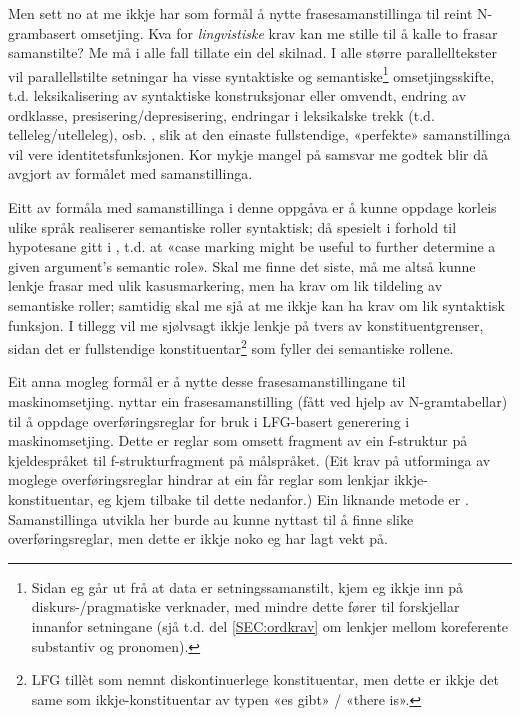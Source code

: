 \documentclass[12pt,a4paper,oneside,draft]{report}
\begin{document}
Men sett no at me ikkje har som formål å nytte frasesamanstillinga til
 reint N-grambasert omsetjing. Kva for \emph{lingvistiske} krav kan me
 stille til å kalle to frasar samanstilte? Me må i alle fall tillate
 ein del skilnad.  I alle større parallelltekster vil parallellstilte
 setningar ha visse syntaktiske og semantiske\footnote{Sidan eg går ut frå at data er setningssamanstilt, kjem eg
       ikkje inn på diskurs-/pragmatiske verknader, med mindre dette
       fører til forskjellar innanfor setningane (sjå t.d. del
       \ref{SEC:ordkrav} om lenkjer mellom koreferente substantiv og
       pronomen). } omsetjingsskifte,
 t.d. leksikalisering av syntaktiske konstruksjonar eller omvendt,
 endring av ordklasse, presisering/depresisering, endringar i
 leksikalske trekk (t.d. telleleg/utelleleg),
 osb. \citep[s.~56--62]{munday2001its}, slik at den einaste
 fullstendige, «perfekte» samanstillinga vil vere
 identitetsfunksjonen. Kor mykje mangel på samsvar me godtek blir då
 avgjort av formålet med samanstillinga.

Eitt av formåla med samanstillinga i denne oppgåva er å kunne oppdage
 korleis ulike språk realiserer semantiske roller syntaktisk; då
 spesielt i forhold til hypotesane gitt i \citet[s.~7]{xpar2008rcn},
 t.d. at «case marking might be useful to further determine a given
 argument's semantic role». Skal me finne det siste, må me altså kunne
 lenkje frasar med ulik kasusmarkering, men ha krav om lik tildeling
 av semantiske roller; samtidig skal me sjå at me ikkje kan ha krav om
 lik syntaktisk funksjon. I tillegg vil me sjølvsagt ikkje lenkje på
 tvers av konstituentgrenser, sidan det er fullstendige
 konstituentar\footnote{LFG tillèt som nemnt diskontinuerlege konstituentar, men dette
        er ikkje det same som ikkje-konstituentar av typen «es gibt» /
        «there is». } som fyller dei semantiske rollene.

Eit anna mogleg formål er å nytte desse frasesamanstillingane til
 maskinomsetjing. \citet{riezler2006gmt} nyttar ein frasesamanstilling
 (fått ved hjelp av N-gramtabellar) til å oppdage overføringsreglar
 for bruk i LFG-basert generering i maskinomsetjing. Dette er reglar
 som omsett fragment av ein f-struktur på kjeldespråket til
 f-strukturfragment på målspråket. (Eit krav på utforminga av moglege
 overføringsreglar hindrar at ein får reglar som lenkjar
 ikkje-konstituentar, eg kjem tilbake til dette nedanfor.) Ein
 liknande metode er \citet{graham2010dsl,graham2009fts}.
 Samanstillinga utvikla her burde au kunne nyttast til å finne slike
 overføringsreglar, men dette er ikkje noko eg har lagt vekt på.
\end{document}
